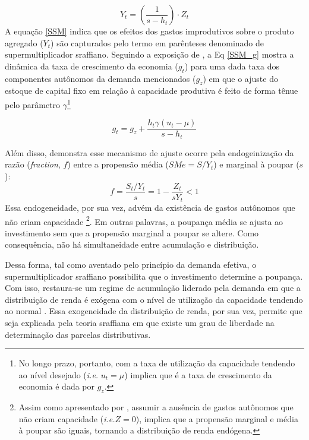 \begin{equation}
Y_t = \left( \frac{1}{s-h_t} \right)\cdot Z_t
\label{SSM}
\end{equation}
A equação \ref{SSM} indica que os efeitos dos gastos improdutivos sobre o produto agregado ($Y_t$) são capturados pelo termo em parênteses denominado de supermultiplicador sraffiano. Seguindo a exposição de \textcite{serrano_sraffian_2017}, a Eq \ref{SSM_g} mostra a dinâmica da taxa de crescimento da economia ($g_t$) para uma dada taxa dos componentes autônomos da demanda mencionados ($g_z$) em que o ajuste do estoque de capital fixo em relação à capacidade produtiva é feito de forma tênue pelo parâmetro $\gamma$\footnote{No longo prazo, portanto, com a taxa de utilização da capacidade tendendo ao nível desejado (\textit{i.e.} $u_t = \mu$) implica que é a taxa de crescimento da economia é dada por $g_z$.}

\begin{equation}
g_t = g_z + \frac{h_t\gamma(u_t-\mu)}{s-h_t}
\label{SSM_g}
\end{equation}

Além disso, \textcite{serrano_sraffian_1995} demonstra esse mecanismo de ajuste ocorre pela endogeinização da razão (\textit{fraction}, $f$) entre a propensão média ($S{Me} = S/Y_t$)  e marginal à poupar ($s$):
$$ f  =  \frac{S_t/Y_t}{s} = 1 - \frac{Z_t}{sY_t} < 1$$ 
Essa endogeneidade, por sua vez, advém da existência de gastos autônomos que não criam capacidade \cite{serrano_sraffian_2017}\footnote{Assim como apresentado por \textcite{serrano_sraffian_2017}, assumir a ausência de gastos autônomos que não criam capacidade (\textit{i.e.}$Z = 0$), implica que a propensão marginal e média à poupar são iguais, tornando a distribuição de renda endógena.}.  
Em outras palavras, a poupança média se ajusta ao investimento sem que a propensão marginal a poupar se altere. 
Como consequência, não há simultaneidade entre acumulação e distribuição.  

Dessa forma, tal como aventado pelo princípio da demanda efetiva, o supermultiplicador sraffiano possibilita que o investimento determine a poupança.
Com isso, restaura-se um regime de acumulação liderado pela demanda em que a distribuição de renda é exógena com o nível de utilização da capacidade tendendo ao normal \cite{nikiforos_comments_2018}. Essa exogeneidade da distribuição de renda, por sua vez, permite que seja explicada pela teoria sraffiana em que existe um grau de liberdade na determinação das parcelas distributivas.



